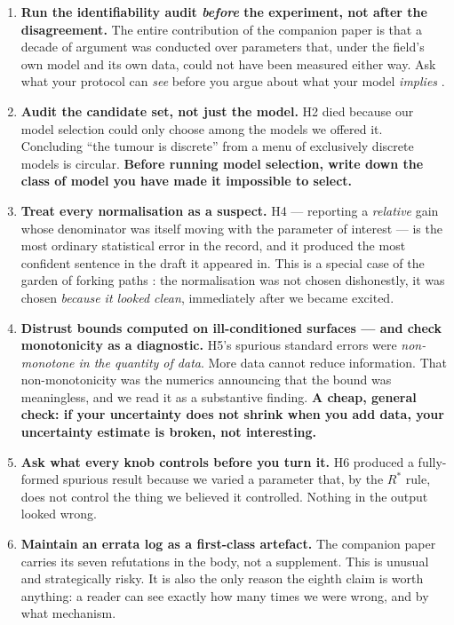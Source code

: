 \documentclass[11pt,a4paper]{article}
\begin{document}
\begin{enumerate}[leftmargin=1.8em,itemsep=0.4em]

\item \textbf{Run the identifiability audit \emph{before} the experiment, not after the
disagreement.} The entire contribution of the companion paper is that a decade of
argument was conducted over parameters that, under the field's own model and its own
data, could not have been measured either way. Ask what your protocol can \emph{see}
before you argue about what your model \emph{implies}
\citep{raue2009structural,eisenberg2017confidence}.

\item \textbf{Audit the candidate set, not just the model.} H2 died because our model
selection could only choose among the models we offered it. Concluding ``the tumour is
discrete'' from a menu of exclusively discrete models is circular. \textbf{Before
running model selection, write down the class of model you have made it impossible to
select.}

\item \textbf{Treat every normalisation as a suspect.} H4 --- reporting a
\emph{relative} gain whose denominator was itself moving with the parameter of interest
--- is the most ordinary statistical error in the record, and it produced the most
confident sentence in the draft it appeared in. This is a special case of the garden of
forking paths \citep{gelman2013garden}: the normalisation was not chosen dishonestly,
it was chosen \emph{because it looked clean}, immediately after we became excited.

\item \textbf{Distrust bounds computed on ill-conditioned surfaces --- and check
monotonicity as a diagnostic.} H5's spurious standard errors were \emph{non-monotone in
the quantity of data}. More data cannot reduce information. That non-monotonicity was
the numerics announcing that the bound was meaningless, and we read it as a substantive
finding. \textbf{A cheap, general check: if your uncertainty does not shrink when you
add data, your uncertainty estimate is broken, not interesting.}

\item \textbf{Ask what every knob controls before you turn it.} H6 produced a
fully-formed spurious result because we varied a parameter that, by the $R^*$ rule,
does not control the thing we believed it controlled. Nothing in the output looked
wrong.

\item \textbf{Maintain an errata log as a first-class artefact.} The companion paper
carries its seven refutations in the body, not a supplement. This is unusual and
strategically risky. It is also the only reason the eighth claim is worth anything: a
reader can see exactly how many times we were wrong, and by what mechanism.

\end{enumerate}
\end{document}
